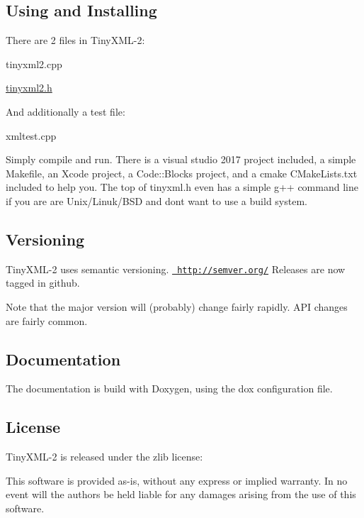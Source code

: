 \subsection*{Using and Installing }

There are 2 files in Tiny\+X\+M\+L-\/2\+:
\begin{DoxyItemize}
\item tinyxml2.\+cpp
\item \mbox{\hyperlink{tinyxml2_8h_source}{tinyxml2.\+h}}
\end{DoxyItemize}

And additionally a test file\+:
\begin{DoxyItemize}
\item xmltest.\+cpp
\end{DoxyItemize}

Simply compile and run. There is a visual studio 2017 project included, a simple Makefile, an Xcode project, a Code\+::\+Blocks project, and a cmake C\+Make\+Lists.\+txt included to help you. The top of tinyxml.\+h even has a simple g++ command line if you are are Unix/\+Linuk/\+B\+SD and don\textquotesingle{}t want to use a build system.

\subsection*{Versioning }

Tiny\+X\+M\+L-\/2 uses semantic versioning. \href{http://semver.org/}{\texttt{ http\+://semver.\+org/}} Releases are now tagged in github.

Note that the major version will (probably) change fairly rapidly. A\+PI changes are fairly common.

\subsection*{Documentation }

The documentation is build with Doxygen, using the \textquotesingle{}dox\textquotesingle{} configuration file.

\subsection*{License }

Tiny\+X\+M\+L-\/2 is released under the zlib license\+:

This software is provided \textquotesingle{}as-\/is\textquotesingle{}, without any express or implied warranty. In no event will the authors be held liable for any damages arising from the use of this software.

